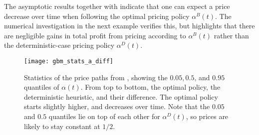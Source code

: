 \documentclass[main.tex]{subfiles}
\begin{document}
The asymptotic results together with  indicate that one can expect a price
decrease over time when following the optimal pricing policy
$\alpha^B(t)$.
The numerical investigation in the next example verifies this, but highlights
that there are negligible gains in total profit from pricing according to
$\alpha^B(t)$ rather than the deterministic-case
pricing policy $\alpha^D(t)$.

\begin{figure}[htb]
  \centering
  \texttt{[image: gbm\_stats\_a\_diff]}
  \caption{Statistics of the price paths from
    , %
    showing the $0.05,0.5$, and
    $0.95$ quantiles of $\alpha(t)$. From top to bottom, the optimal
    policy, the deterministic heuristic, and their difference.
    The optimal policy starts slightly higher, and decreases over
    time.
    Note that the $0.05$ and $0.5$ quantiles lie on top of each
    other for $\alpha^D(t)$, so prices are likely to stay constant
    at $1/2$.
  }\label{fig:gbm_stats_a}
\end{figure}
\end{document}
